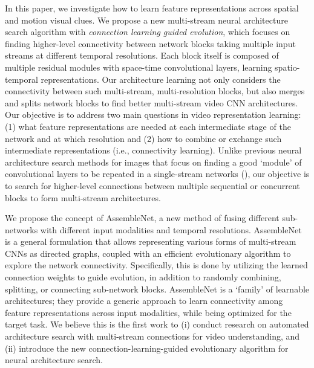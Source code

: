 \documentclass{article} \usepackage{iclr2020_conference,times}
\begin{document}
In this paper, we investigate how to learn feature representations across spatial and motion visual clues. We propose a new multi-stream neural architecture search algorithm with \emph{connection learning guided evolution}, which focuses on finding higher-level connectivity between network blocks taking multiple input streams at different temporal resolutions. Each block itself is composed of multiple residual modules with space-time convolutional layers, learning spatio-temporal representations. 
Our architecture learning not only considers the connectivity between such multi-stream, multi-resolution blocks, but also merges and splits network blocks to find better multi-stream video CNN architectures. Our objective is to address two main questions in video representation learning: (1) what feature representations are needed at each intermediate stage of the network and at which resolution and (2) how to combine or exchange such intermediate representations (i.e., connectivity learning). 
Unlike previous neural architecture search methods for images that focus on finding a good `module' of convolutional layers to be repeated in a single-stream networks (\citealp{zoph2018nas,real2019amoeba}), our objective is to search for higher-level connections between multiple sequential or concurrent blocks to form multi-stream architectures.













We propose the concept of AssembleNet, a new method of fusing different sub-networks with different input modalities and temporal resolutions. AssembleNet is a general formulation that allows representing various forms of multi-stream CNNs as directed graphs, coupled with an efficient evolutionary algorithm to explore the network connectivity. Specifically, this is done by utilizing the learned connection weights to guide  evolution, in addition to randomly combining, splitting, or connecting sub-network blocks. 
AssembleNet is a `family' of learnable architectures; they provide a generic approach to learn connectivity among feature representations across input modalities, while being optimized for the target task.
We believe this is the first work to (i) conduct research on automated architecture search with multi-stream connections for video understanding, and (ii) introduce the new connection-learning-guided evolutionary algorithm for neural architecture search. 
\end{document}
